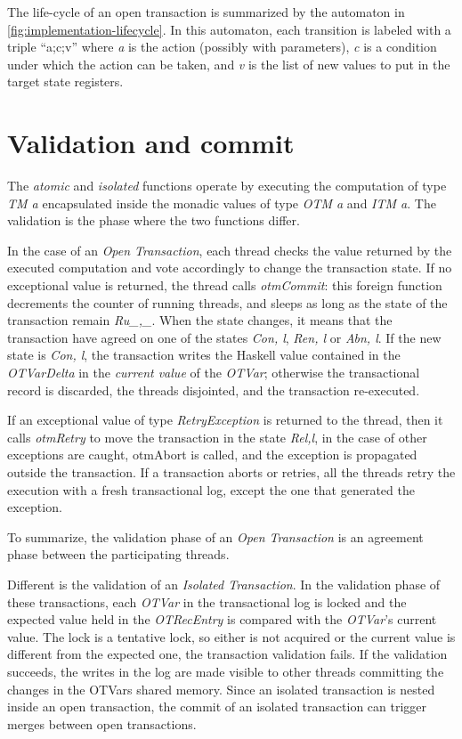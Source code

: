 The life-cycle of an open transaction is summarized by the automaton in \cref{fig:implementation-lifecycle}.
In this automaton, each transition is labeled with a triple ``a;c;v'' where \emph{a} is the action (possibly with parameters), \emph{c} is a condition under which the action can be taken, and \emph{v} is the list of new values to put in the target state registers.



\section{Validation and commit}

The \emph{atomic} and \emph{isolated} functions operate by executing the computation of type \emph{TM a} encapsulated inside the monadic values of type \emph{OTM a} and \emph{ITM a}.
The validation is the phase where the two functions differ.

In the case of an \emph{Open Transaction}, each thread checks the value returned by the executed computation and vote accordingly to change the transaction state.
If no exceptional value is returned, the thread calls \emph{otmCommit}: this foreign function decrements the counter of running threads, and sleeps as long as the state of the transaction remain \emph{Ru\textlangle \_,\_\textrangle}.
When the state changes, it means that the transaction have agreed on one of the states \emph{Co\textlangle n, l\textrangle}, \emph{Re\textlangle n, l\textrangle} or \emph{Ab\textlangle n, l\textrangle}.
If the new state is \emph{Co\textlangle n, l\textrangle}, the transaction writes the Haskell value contained in the \emph{OTVarDelta} in the \emph{current value} of the \emph{OTVar}; otherwise the transactional record is discarded, the threads disjointed, and the transaction re-executed.

If an exceptional value of type \emph{RetryException} is returned to the thread, then it calls \emph{otmRetry} to move the transaction in the state \emph{Re\textlangle l,l\textrangle}, in the case of other exceptions are caught, otmAbort is called, and the exception is propagated outside the transaction. If a transaction aborts or retries, all the threads retry the execution with a fresh transactional log, except the one that generated the exception.

To summarize, the validation phase of an \emph{Open Transaction} is an agreement phase between the participating threads.

Different is the validation of an \emph{Isolated Transaction}.
In the validation phase of these transactions, each \emph{OTVar} in the transactional log is locked and the expected value held in the \emph{OTRecEntry} is compared with the \emph{OTVar}'s current value.
The lock is a tentative lock, so either is not acquired or the current value is different from the expected one, the transaction validation fails.
If the validation succeeds, the writes in the log are made visible to other threads committing the changes in the OTVars shared memory. Since an isolated transaction is nested inside an open transaction, the commit of an isolated transaction can trigger merges between open transactions.

